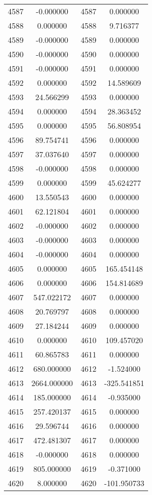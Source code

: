 \documentclass[12pt]{article}
\begin{document}
\begin{longtable}{@{}cccc@{}}
4587 & -0.000000 & 4587 & 0.000000 \\
4588 & 0.000000 & 4588 & 9.716377 \\
4589 & -0.000000 & 4589 & 0.000000 \\
4590 & -0.000000 & 4590 & 0.000000 \\
4591 & -0.000000 & 4591 & 0.000000 \\
4592 & 0.000000 & 4592 & 14.589609 \\
4593 & 24.566299 & 4593 & 0.000000 \\
4594 & 0.000000 & 4594 & 28.363452 \\
4595 & 0.000000 & 4595 & 56.808954 \\
4596 & 89.754741 & 4596 & 0.000000 \\
4597 & 37.037640 & 4597 & 0.000000 \\
4598 & -0.000000 & 4598 & 0.000000 \\
4599 & 0.000000 & 4599 & 45.624277 \\
4600 & 13.550543 & 4600 & 0.000000 \\
4601 & 62.121804 & 4601 & 0.000000 \\
4602 & -0.000000 & 4602 & 0.000000 \\
4603 & -0.000000 & 4603 & 0.000000 \\
4604 & -0.000000 & 4604 & 0.000000 \\
4605 & 0.000000 & 4605 & 165.454148 \\
4606 & 0.000000 & 4606 & 154.814689 \\
4607 & 547.022172 & 4607 & 0.000000 \\
4608 & 20.769797 & 4608 & 0.000000 \\
4609 & 27.184244 & 4609 & 0.000000 \\
4610 & 0.000000 & 4610 & 109.457020 \\
4611 & 60.865783 & 4611 & 0.000000 \\
4612 & 680.000000 & 4612 & -1.524000 \\
4613 & 2664.000000 & 4613 & -325.541851 \\
4614 & 185.000000 & 4614 & -0.935000 \\
4615 & 257.420137 & 4615 & 0.000000 \\
4616 & 29.596744 & 4616 & 0.000000 \\
4617 & 472.481307 & 4617 & 0.000000 \\
4618 & -0.000000 & 4618 & 0.000000 \\
4619 & 805.000000 & 4619 & -0.371000 \\
4620 & 8.000000 & 4620 & -101.950733 \\

\end{longtable}
\end{document}
